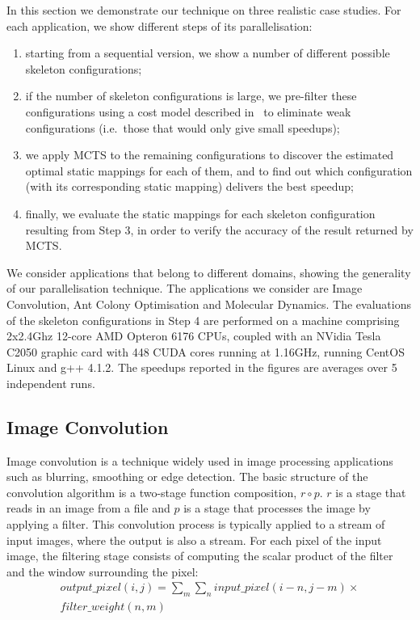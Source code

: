 \documentclass[smallextended]{svjour3}
\begin{document}
\noindent
In this section we demonstrate our technique on three
realistic case studies. For each application, we show different steps of
its parallelisation: 
\begin{enumerate}
\item starting from a sequential version, we
show a number of different possible skeleton configurations; 
\item if the number of skeleton configurations is
  large, we pre-filter these configurations using a cost model
described in~\cite{hlpp} to eliminate weak configurations
(i.e.\ those that would only give small speedups); 
\item we apply MCTS to the remaining configurations to discover the estimated optimal 
static mappings for each of them, and to find out which configuration
(with its corresponding static mapping) delivers the best speedup;
\item  finally, we evaluate the static mappings for each skeleton
configuration resulting from Step 3, in order to
verify the accuracy of the result returned by MCTS.
\end{enumerate} 

\noindent
We consider applications that belong to different domains, showing the
generality of our parallelisation technique. The applications we consider are
Image Convolution, Ant Colony
Optimisation and Molecular Dynamics. The evaluations of the skeleton
configurations in Step 4 are performed on a machine comprising 2x2.4Ghz 12-core 
AMD Opteron 6176 CPUs, coupled with an NVidia Tesla C2050 graphic card
with 448 CUDA cores running at 1.16GHz, running CentOS Linux 
 and g++ 4.1.2. The speedups reported in the figures are
averages over 5 independent runs.


\subsection{Image Convolution}
\noindent
Image convolution is a technique widely used in image processing applications such as blurring, smoothing
or edge detection. 
The basic structure of the convolution algorithm is a two-stage function composition, $ r \circ p $.
$r$ is a stage that reads in an image from a file and $p$ is a stage
that processes the image by applying a filter. This
convolution process is typically applied to a stream of input images,
where the output is also a stream.
For each pixel of the input image, the filtering stage consists of computing the scalar product of the
filter and the window surrounding the pixel:
\begin{multline}
\label{eqn:01}
output\_pixel(i,j)=\sum_{m}\sum_{n} input\_pixel(i-n,j-m)\times\\
filter\_weight(n,m){}
\end{multline}
\end{document}
